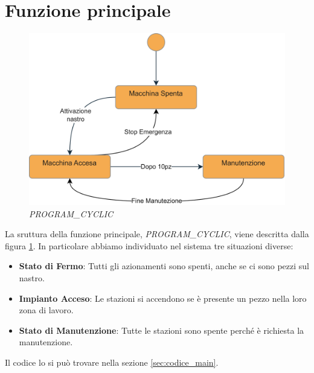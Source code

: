 \documentclass{article}
\begin{document}
\section{Funzione principale}
\begin{figure}
    \centering
    \includegraphics[width = 1 \linewidth]{Diagrammi/TestoStrutturato-main.png}
    \caption{\textit{PROGRAM\_CYCLIC}}
    \label{fig:main}
\end{figure}
La sruttura della funzione principale, \textit{PROGRAM\_CYCLIC}, viene descritta dalla figura \ref{fig:main}. In particolare abbiamo individuato nel sistema tre situazioni diverse:
\begin{itemize}
    \item \textbf{Stato di Fermo}: Tutti gli azionamenti sono spenti, anche se ci sono pezzi sul nastro.
    \item \textbf{Impianto Acceso}: Le stazioni si accendono se è presente un pezzo nella loro zona di lavoro.
    \item \textbf{Stato di Manutenzione}: Tutte le stazioni sono spente perché è richiesta la manutenzione.
\end{itemize}
Il codice lo si può trovare nella sezione \ref{sec:codice_main}.  
\end{document}
